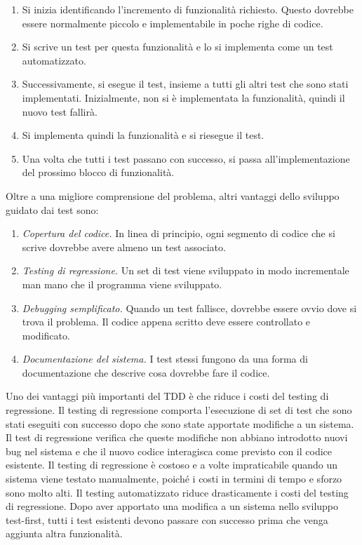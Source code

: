 \begin{enumerate}
    \item Si inizia identificando l'incremento di funzionalità richiesto. Questo dovrebbe essere normalmente piccolo e implementabile in poche righe di codice.
    \item Si scrive un test per questa funzionalità e lo si implementa come un test automatizzato.
    \item Successivamente, si esegue il test, insieme a tutti gli altri test che sono stati implementati. Inizialmente, non si è implementata la funzionalità, quindi il nuovo test fallirà.
    \item Si implementa quindi la funzionalità e si riesegue il test.
    \item Una volta che tutti i test passano con successo, si passa all'implementazione del prossimo blocco di funzionalità.
\end{enumerate}
Oltre a una migliore comprensione del problema, altri vantaggi dello sviluppo guidato dai test sono:
\begin{enumerate}
    \item \textit{Copertura del codice.} In linea di principio, ogni segmento di codice che si scrive dovrebbe avere almeno un test associato.
    \item \textit{Testing di regressione.} Un set di test viene sviluppato in modo incrementale man mano che il programma viene sviluppato.
    \item \textit{Debugging semplificato.} Quando un test fallisce, dovrebbe essere ovvio dove si trova il problema. Il codice appena scritto deve essere controllato e modificato.
    \item \textit{Documentazione del sistema.} I test stessi fungono da una forma di documentazione che descrive cosa dovrebbe fare il codice.
\end{enumerate}
Uno dei vantaggi più importanti del TDD è che riduce i costi del testing di regressione. Il testing di regressione comporta l'esecuzione di set di test che sono stati eseguiti con successo dopo che sono state apportate modifiche a un sistema. Il test di regressione verifica che queste modifiche non abbiano introdotto nuovi bug nel sistema e che il nuovo codice interagisca come previsto con il codice esistente. Il testing di regressione è costoso e a volte impraticabile quando un sistema viene testato manualmente, poiché i costi in termini di tempo e sforzo sono molto alti. Il testing automatizzato riduce drasticamente i costi del testing di regressione. Dopo aver apportato una modifica a un sistema nello sviluppo test-first, tutti i test esistenti devono passare con successo prima che venga aggiunta altra funzionalità.

